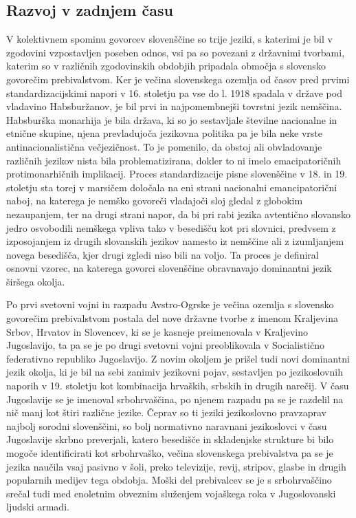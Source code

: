 \begin{multicols}{2}
\subsection{Razvoj v zadnjem času}

V kolektivnem spominu go\-vorcev slovenščine so trije jeziki, s katerimi je bil v zgodovini vzpostav\-ljen poseben odnos, vsi pa so povezani z državnimi tvorbami, katerim so v različnih zgodovinskih obdobjih pripadala območja s slovensko go\-vorečim prebivalstvom. Ker je večina slovenskega ozemlja od časov pred prvimi standardizacij\-skimi napori v 16. stoletju pa vse do l. 1918 spadala v države pod vladavino Habs\-buržanov, je bil prvi in naj\-pomembnejši tovrstni jezik nemščina. Habs\-burška monarhija je bila država, ki so jo sestav\-ljale številne nacionalne in etnične skupine, njena prevladujoča jezikovna politika pa je bila neke vrste antinacionalistična večjezičnost. To je po\-menilo, da obstoj ali obvladovanje različnih jezikov nista bila problematizirana, dokler to ni imelo emacipatoričnih protimonarhičnih implikacij. Proces standardizacije pisne slovenščine v 18. in 19. stoletju sta torej v marsičem določala na eni strani nacionalni emancipatorični naboj, na katerega je nemško go\-voreči vladajoči sloj gledal z globokim nezaupanjem, ter na drugi strani napor, da bi pri rabi jezika avtentično slovansko jedro osvobodili nemškega vpliva tako v besedišču kot pri slovnici, predvsem z izposojanjem iz drugih slovanskih jezikov namesto iz nemščine ali z izumljanjem novega besedišča, kjer drugi zgledi niso bili na voljo. Ta proces je definiral osnovni vzorec, na katerega go\-vorci slovenščine obravnavajo dominantni jezik širšega okolja.


Po prvi svetovni vojni in razpadu Avstro-Ogrske je večina ozemlja s slovensko go\-vorečim prebivalstvom postala del nove državne tvorbe z imenom Kraljevina Srbov, Hrvatov in Slovencev, ki se je kasneje preimenovala v Kraljevino Jugoslavijo, ta pa se je po drugi svetovni vojni preoblikovala v Socialistično federativno republiko Jugoslavijo. Z novim okoljem je prišel tudi novi dominantni jezik okolja, ki je bil na sebi zanimiv jezikovni pojav, sestav\-ljen po jezikoslovnih naporih v 19. stoletju kot kombinacija hrvaških, srbskih in drugih narečij. V času Jugoslavije se je imenoval srbohrvaščina, po njenem razpadu pa se je razdelil na nič manj kot štiri različne jezike. Čeprav so ti jeziki jezikoslovno pravzaprav naj\-bolj sorodni slovenščini, so bolj normativno naravnani jezikoslovci v času Jugoslavije skrbno preverjali, katero besedišče in skladenjske strukture bi bilo mogoče identificirati kot srbohrvaško, večina slovenskega prebivalstva pa se je jezika naučila vsaj pasivno v šoli, preko televizije, revij, stripov, glasbe in drugih popularnih medijev tega obdobja. Moški del prebivalcev se je s srbohrvaščino srečal tudi med enoletnim obveznim služenjem vojaškega roka v Jugoslovanski ljudski armadi.


\end{multicols}
